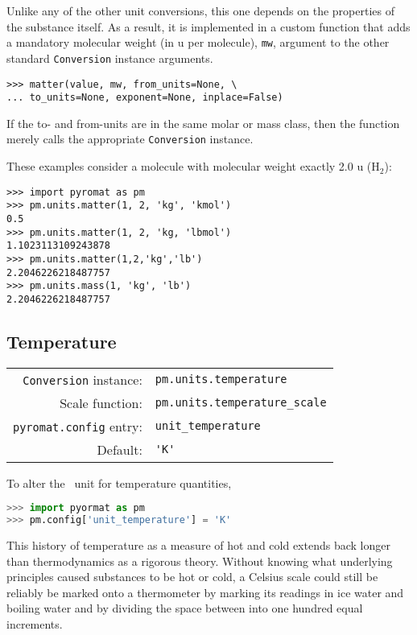 Unlike any of the other unit conversions, this one depends on the properties of the substance itself.  As a result, it is implemented in a custom function that adds a mandatory molecular weight (in u per molecule), \verb|mw|, argument to the other standard \verb|Conversion| instance arguments.

\begin{lstlisting}
>>> matter(value, mw, from_units=None, \
... to_units=None, exponent=None, inplace=False)
\end{lstlisting}

If the to- and from-units are in the same molar or mass class, then the function merely calls the appropriate \verb|Conversion| instance.

These examples consider a molecule with molecular weight exactly 2.0 u (H$_2$):
\begin{lstlisting}
>>> import pyromat as pm
>>> pm.units.matter(1, 2, 'kg', 'kmol')
0.5
>>> pm.units.matter(1, 2, 'kg, 'lbmol')
1.1023113109243878
>>> pm.units.matter(1,2,'kg','lb')
2.2046226218487757
>>> pm.units.mass(1, 'kg', 'lb')
2.2046226218487757
\end{lstlisting}

%
%

\subsection{Temperature}\label{sec:units:temperature}

\begin{tabular}{rl}
\hline
\verb|Conversion| instance: & \verb|pm.units.temperature|\\
Scale function: & \verb|pm.units.temperature_scale|\\
\verb|pyromat.config| entry: & \verb|unit_temperature|\\
Default: & \verb|'K'|\\
\hline
\end{tabular}
\vspace{1em}

To alter the \PM\ unit for temperature quantities,
\begin{lstlisting}[language=Python]
>>> import pyormat as pm
>>> pm.config['unit_temperature'] = 'K'
\end{lstlisting}

This history of temperature as a measure of hot and cold extends back longer than thermodynamics as a rigorous theory.  Without knowing what underlying principles caused substances to be hot or cold, a Celsius scale could still be reliably be marked onto a thermometer by marking its readings in ice water and boiling water and by dividing the space between into one hundred equal increments. 

